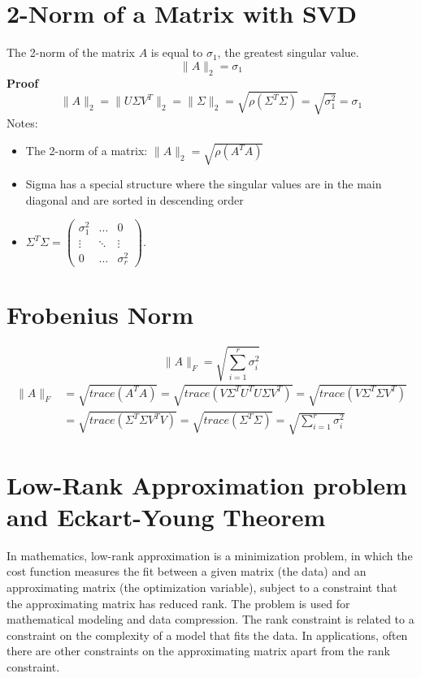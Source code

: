 \section{2-Norm of a Matrix with SVD}
The 2-norm of the matrix $A$ is equal to $\sigma_1$, the greatest singular value.
\[
\|A\|_2 = \sigma_1
\]
\textbf{Proof}
$$
\|A\|_2 = \|U\Sigma V^T\|_2 = \|\Sigma\|_2 = \sqrt{\rho(\Sigma^T\Sigma)} = \sqrt{\sigma_1^2} = \sigma_1
$$
Notes:
\begin{itemize}
    \item The 2-norm of a matrix: $\|A\|_2 = \sqrt{\rho(A^TA)}$
    \item Sigma has a special structure where the singular values are in the main diagonal and are sorted in descending order
    \item $\Sigma^T\Sigma = \begin{pmatrix}
        \sigma_1^2 & \ldots & 0 \\
        \vdots & \ddots & \vdots \\
        0 & \ldots & \sigma_r^2
        \end{pmatrix}$.
\end{itemize}

\section{Frobenius Norm}
\[
\|A\|_F = \sqrt{\sum_{i=1}^r \sigma_i^2}
\]
$$
\begin{aligned}
\|A\|_F &= \sqrt{trace(A^TA)} = \sqrt{trace(V\Sigma^T U^T U \Sigma V^T)} = \sqrt{trace(V\Sigma^T \Sigma V^T)} \\
&= \sqrt{trace(\Sigma^T \Sigma V^T V)} = \sqrt{trace(\Sigma^T \Sigma)} = \sqrt{\sum_{i=1}^r \sigma_i^2}        
\end{aligned}
$$
\section{Low-Rank Approximation problem and Eckart-Young Theorem}
In mathematics, low-rank approximation is a minimization problem, in which the cost function measures
the fit between a given matrix (the data) and an approximating matrix (the optimization variable),
subject to a constraint that the approximating matrix has reduced rank. The problem is used for mathematical
modeling and data compression. The rank constraint is related to a constraint on the complexity of a model that
fits the data. In applications, often there are other constraints on the approximating matrix apart from the rank constraint.

